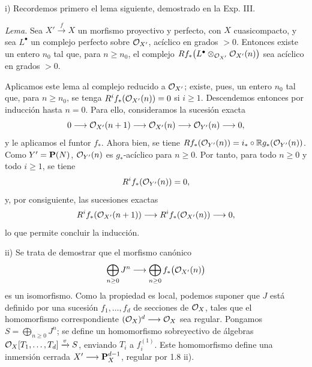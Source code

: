 i) Recordemos primero el lema siguiente, demostrado en la Exp. III.

\textit{Lema.} Sea \(X'\xrightarrow{f}X\) un morfismo proyectivo y perfecto, con \(X\) cuasicompacto, y sea \(L^\bullet\) un complejo perfecto sobre \(\mathcal O_{X'}\), acíclico en grados \(>0\). Entonces existe un entero \(n_0\) tal que, para \(n\ge n_0\), el complejo \(Rf_*\bigl(L^\bullet\otimes_{\mathcal O_{X'}}\mathcal O_{X'}(n)\bigr)\) sea acíclico en grados \(>0\).

Aplicamos este lema al complejo reducido a \(\mathcal O_{X'}\); existe, pues, un entero \(n_0\) tal que, para \(n\ge n_0\), se tenga \(R^if_*(\mathcal O_{X'}(n))=0\) si \(i\ge1\). Descendemos entonces por inducción hasta \(n=0\). Para ello, consideramos la sucesión exacta
\[
0\longrightarrow
\mathcal O_{X'}(n+1)
\longrightarrow
\mathcal O_{X'}(n)
\longrightarrow
\mathcal O_{Y'}(n)
\longrightarrow0,
\]
y le aplicamos el funtor \(f_*\). Ahora bien, se tiene \(Rf_*(\mathcal O_{Y'}(n))=i_*\circ\mathbb Rg_*(\mathcal O_{Y'}(n))\). Como \(Y'=\mathbf P(N)\), \(\mathcal O_{Y'}(n)\) es \(g_*\)-acíclico para \(n\ge0\). Por tanto, para todo \(n\ge0\) y todo \(i\ge1\), se tiene
\[
R^if_*(\mathcal O_{Y'}(n))=0,
\]
y, por consiguiente, las sucesiones exactas
\[
R^if_*(\mathcal O_{X'}(n+1))
\longrightarrow
R^if_*(\mathcal O_{X'}(n))
\longrightarrow0,
\]
lo que permite concluir la inducción.

ii) Se trata de demostrar que el morfismo canónico
\[
\bigoplus_{n\ge0}J^n
\longrightarrow
\bigoplus_{n\ge0}f_*\bigl(\mathcal O_{X'}(n)\bigr)
\]
es un isomorfismo. Como la propiedad es local, podemos suponer que \(J\) está definido por una sucesión \(f_1,\ldots,f_d\) de secciones de \(\mathcal O_X\), tales que el homomorfismo correspondiente \((\mathcal O_X)^d\longrightarrow\mathcal O_X\) sea regular. Pongamos \(S=\bigoplus_{n\ge0}J^n\); se define un homomorfismo sobreyectivo de álgebras \(\mathcal O_X[T_1,\ldots,T_d]\xrightarrow{v}S\), enviando \(T_i\) a \(f_i^{(1)}\). Este homomorfismo define una inmersión cerrada \(X'\longrightarrow\mathbf P_X^{d-1}\), regular por 1.8 ii).

